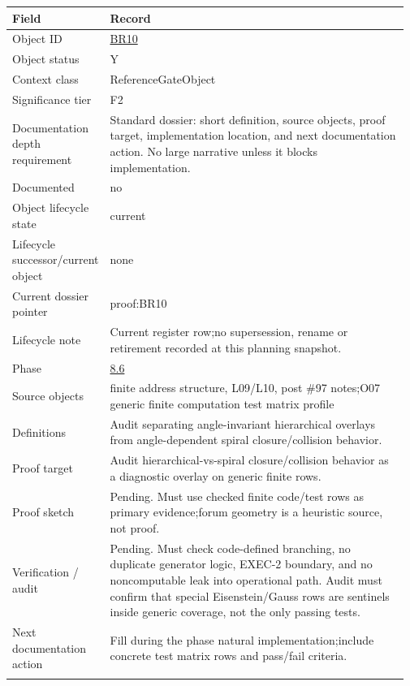 \begin{longtable}{L{0.16\linewidth} L{0.81\linewidth}}
\hline
\textbf{Field} & \textbf{Record}\\
\hline
Object ID & \hyperlink{object-row-BR10}{BR10}\\
\hline\addlinespace[0.20em]
Object status & Y\\
\hline\addlinespace[0.20em]
Context class & ReferenceGateObject\\
\hline\addlinespace[0.20em]
Significance tier & F2\\
\hline\addlinespace[0.20em]
Documentation depth requirement & Standard dossier: short definition, source objects, proof target, implementation location, and next documentation action. No large narrative unless it blocks implementation.\\
\hline\addlinespace[0.20em]
Documented & no\\
\hline\addlinespace[0.20em]
Object lifecycle state & current\\
\hline\addlinespace[0.20em]
Lifecycle successor/\allowbreak{}current object & none\\
\hline\addlinespace[0.20em]
Current dossier pointer & proof:BR10\\
\hline\addlinespace[0.20em]
Lifecycle note & Current register row;\newline no supersession, rename or retirement recorded at this planning snapshot.\\
\hline\addlinespace[0.20em]
Phase & \hyperlink{phase-row-8-6}{8.6}\\
\hline\addlinespace[0.20em]
Source objects & finite address structure, L09/\allowbreak{}L10, post \#97 notes;\newline O07 generic finite computation test matrix profile\\
\hline\addlinespace[0.20em]
Definitions & Audit separating angle-invariant hierarchical overlays from angle-dependent spiral closure/\allowbreak{}collision behavior.\\
\hline\addlinespace[0.20em]
Proof target & Audit hierarchical-vs-spiral closure/\allowbreak{}collision behavior as a diagnostic overlay on generic finite rows.\\
\hline\addlinespace[0.20em]
Proof sketch & Pending. Must use checked finite code/\allowbreak{}test rows as primary evidence;\newline forum geometry is a heuristic source, not proof.\\
\hline\addlinespace[0.20em]
Verification /\allowbreak{} audit & Pending. Must check code-defined branching, no duplicate generator logic, EXEC-2 boundary, and no noncomputable leak into operational path. Audit must confirm that special Eisenstein/\allowbreak{}Gauss rows are sentinels inside generic coverage, not the only passing tests.\\
\hline\addlinespace[0.20em]
Next documentation action & Fill during the phase natural implementation;\newline include concrete test matrix rows and pass/\allowbreak{}fail criteria.\\
\hline\addlinespace[0.20em]
\end{longtable}
